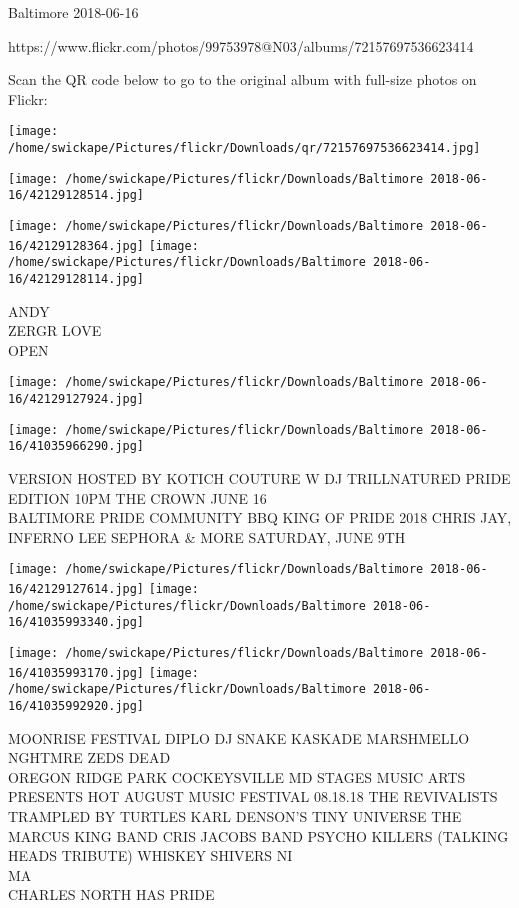 \documentclass[10pt,letterpaper]{article}
\begin{document}
Baltimore 2018-06-16

https://www.flickr.com/photos/99753978@N03/albums/72157697536623414

Scan the QR code below to go to the original album with full-size photos on Flickr:

\texttt{[image: /home/swickape/Pictures/flickr/Downloads/qr/72157697536623414.jpg]}
\pagebreak

\texttt{[image: /home/swickape/Pictures/flickr/Downloads/Baltimore 2018-06-16/42129128514.jpg]}

\vspace{0.25in}
\texttt{[image: /home/swickape/Pictures/flickr/Downloads/Baltimore 2018-06-16/42129128364.jpg]}
\texttt{[image: /home/swickape/Pictures/flickr/Downloads/Baltimore 2018-06-16/42129128114.jpg]}

ANDY\\
ZERGR LOVE\\
OPEN
\pagebreak

\texttt{[image: /home/swickape/Pictures/flickr/Downloads/Baltimore 2018-06-16/42129127924.jpg]}

\vspace{0.25in}
\texttt{[image: /home/swickape/Pictures/flickr/Downloads/Baltimore 2018-06-16/41035966290.jpg]}

VERSION HOSTED BY KOTICH COUTURE W DJ TRILLNATURED PRIDE EDITION 10PM THE CROWN JUNE 16\\
BALTIMORE PRIDE COMMUNITY BBQ KING OF PRIDE 2018 CHRIS JAY, INFERNO LEE SEPHORA \& MORE SATURDAY, JUNE 9TH
\pagebreak

\texttt{[image: /home/swickape/Pictures/flickr/Downloads/Baltimore 2018-06-16/42129127614.jpg]}
\texttt{[image: /home/swickape/Pictures/flickr/Downloads/Baltimore 2018-06-16/41035993340.jpg]}

\texttt{[image: /home/swickape/Pictures/flickr/Downloads/Baltimore 2018-06-16/41035993170.jpg]}
\texttt{[image: /home/swickape/Pictures/flickr/Downloads/Baltimore 2018-06-16/41035992920.jpg]}

MOONRISE FESTIVAL DIPLO DJ SNAKE KASKADE MARSHMELLO NGHTMRE ZEDS DEAD\\
OREGON RIDGE PARK COCKEYSVILLE MD STAGES MUSIC ARTS PRESENTS HOT AUGUST MUSIC FESTIVAL 08.18.18 THE REVIVALISTS TRAMPLED BY TURTLES KARL DENSON'S TINY UNIVERSE THE MARCUS KING BAND CRIS JACOBS BAND PSYCHO KILLERS (TALKING HEADS TRIBUTE) WHISKEY SHIVERS NI\\
MA\\
CHARLES NORTH HAS PRIDE
\pagebreak
\end{document}
